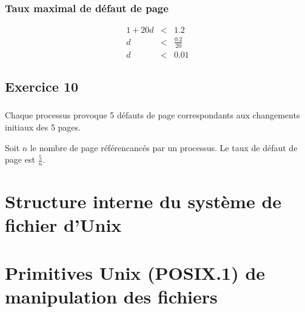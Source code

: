 \documentclass[12pt,a4paper,openany]{book}
\begin{document}
		\subsection{Taux maximal de défaut de page}
		\begin{eqnarray*}
			1 + 20d &<& 1.2\\
			d &<& \frac{0.2}{20}\\
			d &<& 0.01
		\end{eqnarray*}
		\section{Exercice 10}
		\subsection{}
			Chaque processus provoque 5 défauts de page correspondants aux changements initiaux des 5 pages.

			Soit $n$ le nombre de page référencancés par un processus. Le taux de défaut de page est $\frac{5}{n}$.
	\chapter{Structure interne du système de fichier d'Unix}
	\chapter{Primitives Unix (POSIX.1) de manipulation des fichiers}
\end{document}

